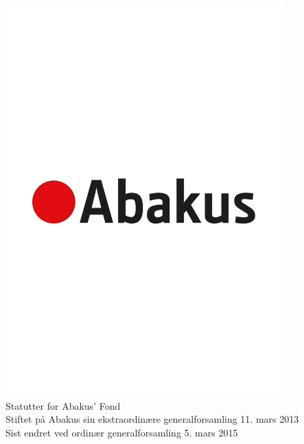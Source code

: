 \documentclass{article}
\begin{document}
\begin{center}
  \includegraphics[width=0.8\textwidth, trim=0 300 0 100, clip]{abakus_logo.eps} \\
  \Large{Statutter for Abakus' Fond} \\
  \vspace{0.4cm}
  \normalsize{Stiftet på Abakus sin ekstraordinære generalforsamling 11. mars 2013 \\
              Sist endret ved ordinær generalforsamling 5. mars 2015}
\end{center}

\newpage
\tableofcontents
\newpage


\end{document}

